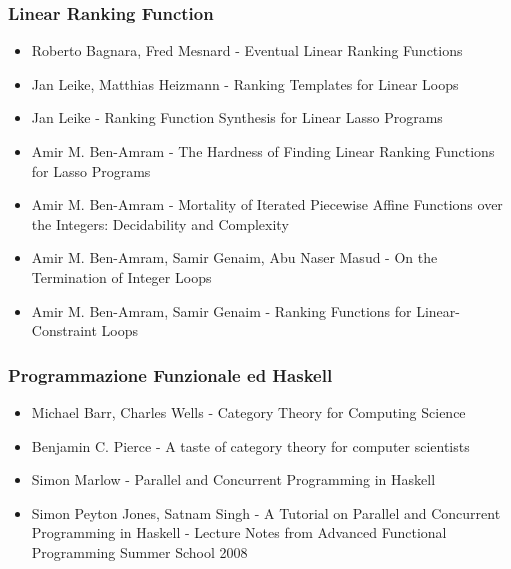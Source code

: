 \documentclass[a4paper]{article}
\begin{document}
\subsubsection{Linear Ranking Function}
\begin{itemize}
  \item Roberto Bagnara, Fred Mesnard - Eventual Linear Ranking Functions 
  \item Jan Leike, Matthias Heizmann - Ranking Templates for Linear Loops
  \item Jan Leike - Ranking Function Synthesis for Linear Lasso Programs
  \item Amir M. Ben-Amram - The Hardness of Finding Linear Ranking Functions for
  Lasso Programs
  \item Amir M. Ben-Amram - Mortality of Iterated Piecewise Affine Functions
  over the Integers:  Decidability and Complexity
  \item Amir M. Ben-Amram, Samir Genaim, Abu Naser Masud - On the Termination of
  Integer Loops
  \item Amir M. Ben-Amram, Samir Genaim - Ranking Functions for
  Linear-Constraint Loops
\end{itemize}

\subsubsection{Programmazione Funzionale ed Haskell}
\begin{itemize}
  \item Michael Barr, Charles Wells - Category Theory for Computing Science
  \item Benjamin C. Pierce - A taste of category theory for computer scientists
  \item Simon Marlow - Parallel and Concurrent Programming in Haskell
  \item Simon Peyton Jones, Satnam Singh - A Tutorial on Parallel and
  Concurrent Programming in Haskell - Lecture Notes from Advanced Functional Programming Summer School 2008
\end{itemize}
\end{document}
